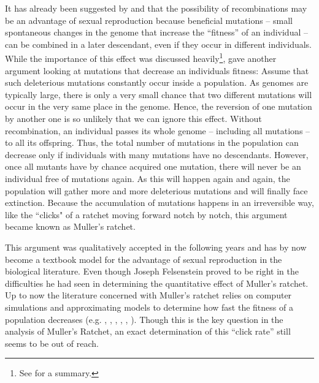 It has already been suggested by \cite{fisher_genetical_1930} and
\cite{muller_genetic_1932} that the possibility of recombinations may be an
advantage of sexual reproduction because beneficial mutations -- small
spontaneous changes in the genome that increase the ``fitness'' of an individual
-- can be combined in a later descendant, even if they occur in different individuals. 
While the importance of this effect was
discussed heavily\footnote{See \cite{felsenstein_evolutionary_1974} for a
summary.}, \cite{muller_relation_1964} gave another argument looking at
mutations that decrease an individuals fitness: Assume that such deleterious
mutations constantly occur inside a population. As genomes are typically large, there is
only a very small chance that two different mutations will occur in the very
same place in the genome. Hence, the reversion of one mutation by another one is so
unlikely that we can ignore this effect. Without recombination, an
individual passes its whole genome -- including all mutations -- to all its
offspring. Thus, the total number of mutations in the population can decrease
only if individuals with many mutations have no descendants. However, once all
mutants have by chance acquired one mutation, there will never be an individual
free of mutations again. As this will happen again and again, the population
will gather more and more deleterious mutations and will finally face
extinction. Because the accumulation of mutations happens in an 
irreversible way, like the ``clicks" of a ratchet moving forward notch by
notch, this argument became known as Muller's ratchet.

This argument was qualitatively accepted in the following years
and has by now become a textbook model for the advantage of sexual reproduction
in the biological literature. Even though Joseph Felsenstein proved to be
right in the difficulties he had seen in determining the quantitative effect of
Muller's ratchet. Up to now the literature concerned with Muller's ratchet
relies on computer simulations and approximating models to determine how fast
the fitness of a population decreases (e.g. \cite{haigh_accumulation_1978},
\cite{lynch_mutation_1990}, \cite{stephan_advance_1993},
\cite{gessler_constraints_1995}, \cite{gordo_degeneration_2000},
\cite{etheridge_how_2008}). Though this is the key question in the analysis of
Muller's Ratchet, an exact determination of this ``click rate'' still seems to
be out of reach.

